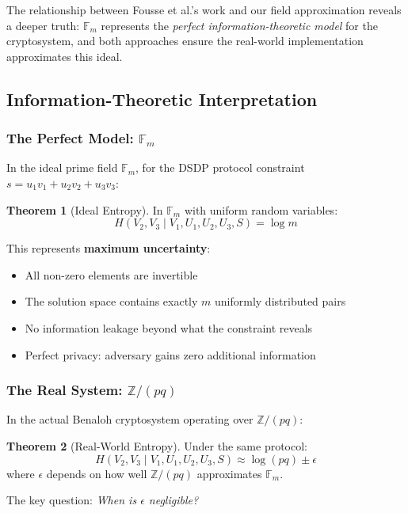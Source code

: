 \documentclass[11pt]{article}
\theoremstyle{definition}
\newtheorem{theorem}{Theorem}
\begin{document}
The relationship between Fousse et al.'s work and our field approximation reveals a deeper truth: $\mathbb{F}_m$ represents the \emph{perfect information-theoretic model} for the cryptosystem, and both approaches ensure the real-world implementation approximates this ideal.

\subsection{Information-Theoretic Interpretation}

\subsubsection{The Perfect Model: $\mathbb{F}_m$}

In the ideal prime field $\mathbb{F}_m$, for the DSDP protocol constraint $s = u_1v_1 + u_2v_2 + u_3v_3$:

\begin{theorem}[Ideal Entropy]
In $\mathbb{F}_m$ with uniform random variables:
\[
H(V_2, V_3 \mid V_1, U_1, U_2, U_3, S) = \log m
\]
\end{theorem}

This represents \textbf{maximum uncertainty}:
\begin{itemize}
\item All non-zero elements are invertible
\item The solution space contains exactly $m$ uniformly distributed pairs
\item No information leakage beyond what the constraint reveals
\item Perfect privacy: adversary gains zero additional information
\end{itemize}

\subsubsection{The Real System: $\mathbb{Z}/(pq)$}

In the actual Benaloh cryptosystem operating over $\mathbb{Z}/(pq)$:

\begin{theorem}[Real-World Entropy]
Under the same protocol:
\[
H(V_2, V_3 \mid V_1, U_1, U_2, U_3, S) \approx \log(pq) \pm \epsilon
\]
where $\epsilon$ depends on how well $\mathbb{Z}/(pq)$ approximates $\mathbb{F}_m$.
\end{theorem}

The key question: \emph{When is $\epsilon$ negligible?}
\end{document}
